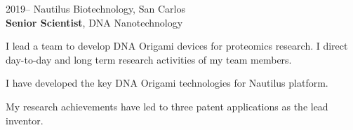 \documentclass[12pt,letterpaper]{report}
\newcommand{\listitemspace}{0.25em}
\renewenvironment{itemize}
{\begin{list}{}{\setlength{\leftmargin}{0em}
                \setlength{\parskip}{0em}
                \setlength{\itemsep}{\listitemspace}
                \setlength{\parsep}{\listitemspace}}}
{\end{list}}
\begin{document}
    \begin{tablist}

        \item[2019--]   \tab{}Nautilus Biotechnology, San Carlos \\
                             \textbf{Senior Scientist}, DNA Nanotechnology\\
                             \begin{itemize}
                                \item \textbullet \hspace{0.2cm} I lead a team to develop DNA Origami devices for proteomics research. I direct day-to-day and long term research activities of my team members.
                                \item \textbullet \hspace{0.2cm} I have developed the key DNA Origami technologies for Nautilus platform.
                                \item \textbullet \hspace{0.2cm} My research achievements have led to three patent applications as the lead inventor. 
                             \end{itemize}


\end{tablist}
\end{document}
